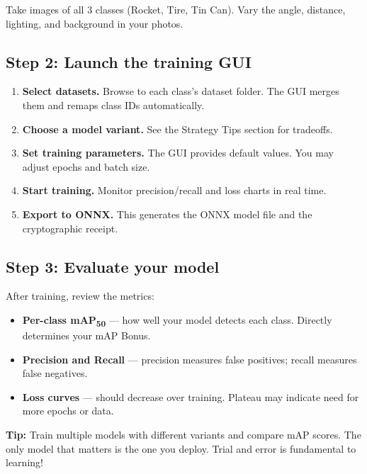 \documentclass[a4]{article}
\begin{document}
Take images of all 3 classes (Rocket, Tire, Tin Can). Vary the angle, distance, lighting, and background in your photos.

\subsection*{Step 2: Launch the training GUI}


\begin{enumerate}
    \item \textbf{Select datasets.} Browse to each class's dataset folder. The GUI merges them and remaps class IDs automatically.
    \item \textbf{Choose a model variant.} See the Strategy Tips section for tradeoffs.
    \item \textbf{Set training parameters.} The GUI provides default values. You may adjust epochs and batch size.
    \item \textbf{Start training.} Monitor precision/recall and loss charts in real time.
    \item \textbf{Export to ONNX.} This generates the ONNX model file and the cryptographic receipt.
\end{enumerate}

\subsection*{Step 3: Evaluate your model}

After training, review the metrics:
\begin{itemize}
    \item \textbf{Per-class mAP\textsubscript{50}} --- how well your model detects each class. Directly determines your mAP Bonus.
    \item \textbf{Precision and Recall} --- precision measures false positives; recall measures false negatives.
    \item \textbf{Loss curves} --- should decrease over training. Plateau may indicate need for more epochs or data.
\end{itemize}

\begin{framed}
\textbf{Tip:} Train multiple models with different variants and compare mAP scores. The only model that matters is the one you deploy. Trial and error is fundamental to learning!
\end{framed}

\pagebreak
\end{document}
